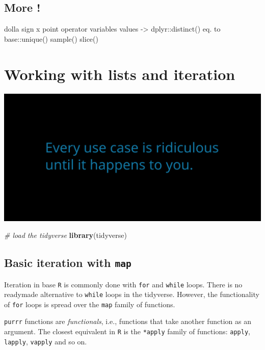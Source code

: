 \documentclass[]{book}
\newenvironment{Shaded}{}{}
\newcommand{\CommentTok}[1]{\textcolor[rgb]{0.38,0.63,0.69}{\textit{#1}}}
\newcommand{\KeywordTok}[1]{\textcolor[rgb]{0.00,0.44,0.13}{\textbf{#1}}}
\newcommand{\NormalTok}[1]{#1}
\begin{document}
\hypertarget{more}{%
\section{More !}\label{more}}

dolla sign x point operator
variables values -\textgreater{} dplyr::distinct() eq. to base::unique()
sample()
slice()

\hypertarget{working-with-lists-and-iteration}{%
\chapter{Working with lists and iteration}\label{working-with-lists-and-iteration}}

\includegraphics{opening-image.png}

\begin{Shaded}
\begin{Highlighting}[]
\CommentTok{# load the tidyverse}
\KeywordTok{library}\NormalTok{(tidyverse)}
\end{Highlighting}
\end{Shaded}

\hypertarget{basic-iteration-with-map}{%
\section{\texorpdfstring{Basic iteration with \texttt{map}}{Basic iteration with map}}\label{basic-iteration-with-map}}

Iteration in base \texttt{R} is commonly done with \texttt{for} and \texttt{while} loops.
There is no readymade alternative to \texttt{while} loops in the tidyverse.
However, the functionality of \texttt{for} loops is spread over the \texttt{map} family of functions.

\texttt{purrr} functions are \emph{functionals}, i.e., functions that take another function as an argument.
The closest equivalent in \texttt{R} is the \texttt{*apply} family of functions: \texttt{apply}, \texttt{lapply}, \texttt{vapply} and so on.
\end{document}
